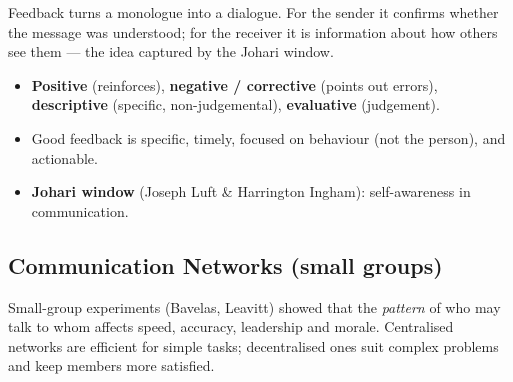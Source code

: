 Feedback turns a monologue into a dialogue. For the sender it confirms whether the message was understood;
for the receiver it is information about how others see them --- the idea captured by the Johari window.

\begin{itemize}
\tightlist
\item
  \textbf{Positive} (reinforces), \textbf{negative / corrective} (points out errors), \textbf{descriptive} (specific, non-judgemental), \textbf{evaluative} (judgement).
\item
  Good feedback is specific, timely, focused on behaviour (not the person), and actionable.
\item
  \textbf{Johari window} (Joseph Luft \& Harrington Ingham): self-awareness in communication.
\end{itemize}



\needspace{125pt}

\hypertarget{p1-04--73-communication-networks-small-groups}{%
\subsection{Communication Networks (small groups)}\label{p1-04--73-communication-networks-small-groups}}

Small-group experiments (Bavelas, Leavitt) showed that the \emph{pattern} of who may talk to whom affects speed,
accuracy, leadership and morale. Centralised networks are efficient for simple tasks; decentralised ones
suit complex problems and keep members more satisfied.



\begingroup\small

